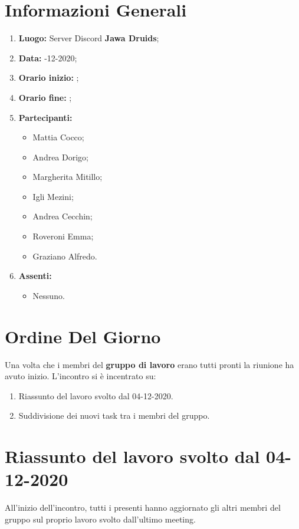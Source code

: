 \newpage
	\section{Informazioni Generali}
	\begin{enumerate}
		\item \textbf{Luogo:} \normalfont Server Discord \textbf{Jawa Druids};
		\item \textbf{Data:} -12-2020;
		\item \textbf{Orario inizio:} ;
		\item \textbf{Orario fine:} ;
		\item \textbf{Partecipanti:}
		\begin{itemize}
			\item Mattia Cocco;
			\item Andrea Dorigo;
			\item Margherita Mitillo;
			\item Igli Mezini;
			\item Andrea Cecchin;
			\item Roveroni Emma;
			\item Graziano Alfredo.
		\end{itemize}
		\item \textbf{Assenti:}
		\begin{itemize}
			\item Nessuno.
		\end{itemize}
	\end{enumerate}
	\section{Ordine Del Giorno}
	Una volta che i membri del \textbf{gruppo di lavoro} erano tutti pronti la riunione ha avuto inizio.
	L'incontro si è incentrato su:
	\begin{enumerate}
		\item Riassunto del lavoro svolto dal 04-12-2020.

		\item Suddivisione dei nuovi task tra i membri del gruppo.

	\end{enumerate}

	\section{Riassunto del lavoro svolto dal 04-12-2020}
	All'inizio dell'incontro, tutti i presenti hanno aggiornato gli altri membri del gruppo sul proprio lavoro svolto dall'ultimo meeting.

